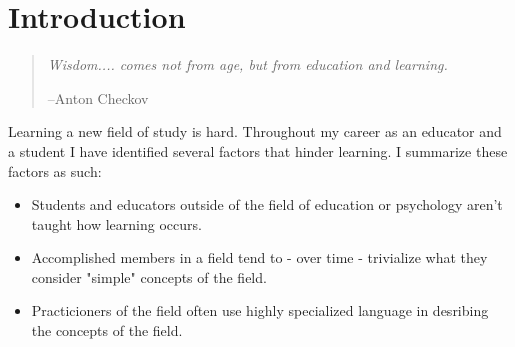 \documentclass[11pt,fleqn]{book} %
\begin{document}



\pagestyle{empty} %

\tableofcontents %

\cleardoublepage %

\pagestyle{fancy} %

\chapter*{Introduction}

\begin{quote}
\textit{Wisdom.... comes not from age, but from education and learning.}

--Anton Checkov
\end{quote}

Learning a new field of study is hard.  Throughout my career as an educator and a student I have identified several factors that hinder learning.  I summarize these factors as such:

\begin{itemize}

\item Students and educators outside of the field of education or psychology aren't taught how learning occurs.

\item Accomplished members in a field tend to - over time - trivialize what they consider "simple" concepts of the field.

\item Practicioners of the field often use highly specialized language in desribing the concepts of the field.

\end{itemize}
\end{document}
